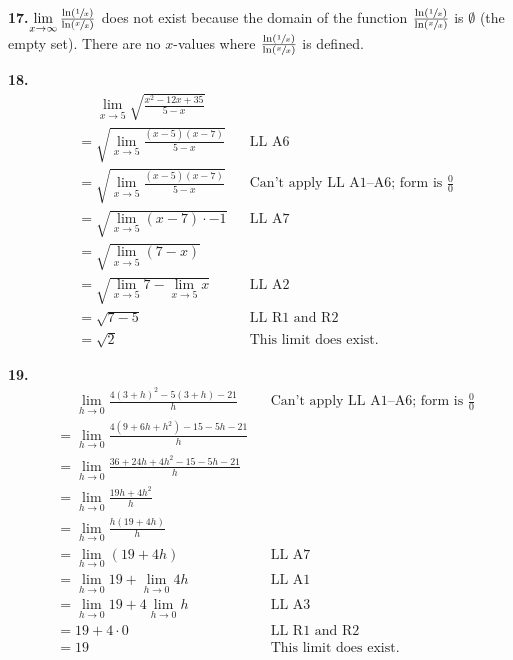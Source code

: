 \documentclass[10pt,oneside,]{book}
\theoremstyle{plain}
\theoremstyle{definition}
\numberwithin{equation}{section}
\newcommand{\fe}[2]{#1\mathopen{}\left(#2\right)\mathclose{}}
\begin{document}
\noindent\textbf{17.}\quad{}\(\lim\limits_{x\to\infty}\frac{\fe{\ln}{\sfrac{1}{x}}}{\fe{\ln}{\sfrac{x}{x}}}\) does not exist because the domain of the function \(\frac{\fe{\ln}{\sfrac{1}{x}}}{\fe{\ln}{\sfrac{x}{x}}}\) is \(\emptyset\) (the empty set). There are no \(x\)-values where \(\frac{\fe{\ln}{\sfrac{1}{x}}}{\fe{\ln}{\sfrac{x}{x}}}\) is defined.%
\par\smallskip
\noindent\textbf{18.}\quad{}\begin{align*}
&\phantom{={}}\lim\limits_{x\to5}\sqrt{\frac{x^2-12x+35}{5-x}}\\
&=\sqrt{\lim\limits_{x\to5}\frac{(x-5)(x-7)}{5-x}}&&\text{LL A6}\\
&=\sqrt{\lim\limits_{x\to5}\frac{(x-5)(x-7)}{5-x}}&&\text{Can't apply LL A1--A6; form is $\tfrac{0}{0}$}\\
&=\sqrt{\lim\limits_{x\to5}(x-7)\cdot-1}&&\text{LL A7}\\
&=\sqrt{\lim\limits_{x\to5}(7-x)}\\
&=\sqrt{\lim\limits_{x\to5}7-\lim\limits_{x\to5}x}&&\text{LL A2}\\
&=\sqrt{7-5}&&\text{LL R1 and R2}\\
&=\sqrt{2}&&\text{This limit does exist.}
\end{align*}%
\par\smallskip
\noindent\textbf{19.}\quad{}\begin{align*}
&\phantom{={}}\lim\limits_{h\to0}\frac{4(3+h)^2-5(3+h)-21}{h}&&\text{Can't apply LL A1--A6; form is $\tfrac{0}{0}$}\\
&=\lim\limits_{h\to0}\frac{4(9+6h+h^2)-15-5h-21}{h}\\
&=\lim\limits_{h\to0}\frac{36+24h+4h^2-15-5h-21}{h}\\
&=\lim\limits_{h\to0}\frac{19h+4h^2}{h}\\
&=\lim\limits_{h\to0}\frac{h(19+4h)}{h}\\
&=\lim\limits_{h\to0}\left(19+4h\right)&&\text{LL A7}\\
&=\lim\limits_{h\to0}19+\lim\limits_{h\to0}4h&&\text{LL A1}\\
&=\lim\limits_{h\to0}19+4\lim\limits_{h\to0}h&&\text{LL A3}\\
&=19+4\cdot0&&\text{LL R1 and R2}\\
&=19&&\text{This limit does exist.}
\end{align*}%
\par\smallskip
\end{document}
